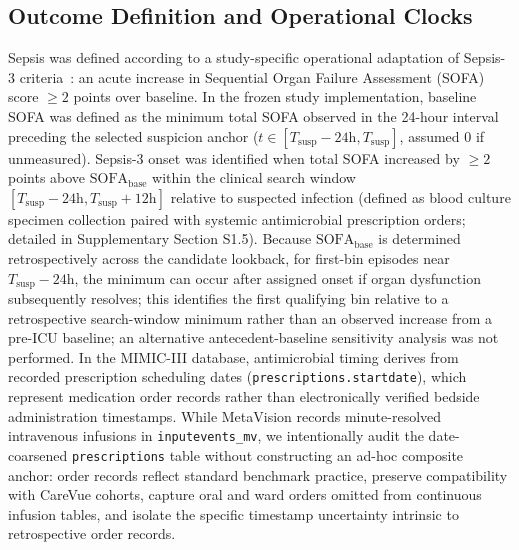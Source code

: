 \documentclass[12pt,a4paper]{article}
\begin{document}
\subsection{Outcome Definition and Operational Clocks}
Sepsis was defined according to a study-specific operational adaptation of Sepsis-3 criteria~\cite{singer2016sepsis,seymour2016assessment}: an acute increase in Sequential Organ Failure Assessment (SOFA) score $\ge 2$ points over baseline. In the frozen study implementation, baseline SOFA was defined as the minimum total SOFA observed in the 24-hour interval preceding the selected suspicion anchor ($t \in [T_{\mathrm{susp}} - 24\mathrm{h}, T_{\mathrm{susp}}]$, assumed 0 if unmeasured). Sepsis-3 onset was identified when total SOFA increased by $\ge 2$ points above $\text{SOFA}_{\text{base}}$ within the clinical search window $[T_{\mathrm{susp}} - 24\text{h}, T_{\mathrm{susp}} + 12\text{h}]$ relative to suspected infection (defined as blood culture specimen collection paired with systemic antimicrobial prescription orders; detailed in Supplementary Section S1.5). Because $\text{SOFA}_{\text{base}}$ is determined retrospectively across the candidate lookback, for first-bin episodes near $T_{\mathrm{susp}}-24\mathrm{h}$, the minimum can occur after assigned onset if organ dysfunction subsequently resolves; this identifies the first qualifying bin relative to a retrospective search-window minimum rather than an observed increase from a pre-ICU baseline; an alternative antecedent-baseline sensitivity analysis was not performed. In the MIMIC-III database, antimicrobial timing derives from recorded prescription scheduling dates (\texttt{prescriptions.\allowbreak startdate}), which represent medication order records rather than electronically verified bedside administration timestamps. While MetaVision records minute-resolved intravenous infusions in \texttt{inputevents\_mv}, we intentionally audit the date-coarsened \texttt{prescriptions} table without constructing an ad-hoc composite anchor: order records reflect standard benchmark practice, preserve compatibility with CareVue cohorts, capture oral and ward orders omitted from continuous infusion tables, and isolate the specific timestamp uncertainty intrinsic to retrospective order records.
\end{document}
